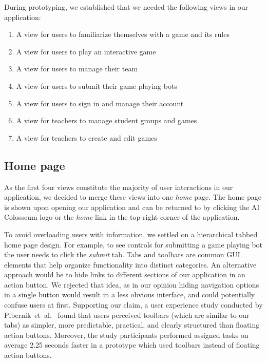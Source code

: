 During prototyping, we established that we needed the following views in our application:

\begin{enumerate}
\item A view for users to familiarize themselves with a game and its rules
\item A view for users to play an interactive game
\item A view for users to manage their team
\item A view for users to submit their game playing bots
\item A view for users to sign in and manage their account
\item A view for teachers to manage student groups and games
\item A view for teachers to create and edit games
\end{enumerate}

\subsection{Home page}

As the first four views constitute the majority of user interactions in our application, we decided to merge these views into one \emph{home} page. The home page is shown upon opening our application and can be returned to by clicking the AI Colosseum logo or the \emph{home} link in the top-right corner of the application.

To avoid overloading users with information, we settled on a hierarchical tabbed home page design. For example, to see controls for submitting a game playing bot the user needs to click the \emph{submit} tab. Tabs and toolbars are common GUI elements that help organize functionality into distinct categories. An alternative approach would be to hide links to different sections of our application in an action button. We rejected that idea, as in our opinion hiding navigation options in a single button would result in a less obvious interface, and could potentially confuse users at first. Supporting our claim, a user experience study conducted by Pibernik~et~al.~\cite{Pibernik2019} found that users perceived toolbars (which are similar to our tabs) as simpler, more predictable, practical, and clearly structured than floating action buttons. Moreover, the study participants performed assigned tasks on average 2.25 seconds faster in a prototype which used toolbars instead of floating action buttons.

